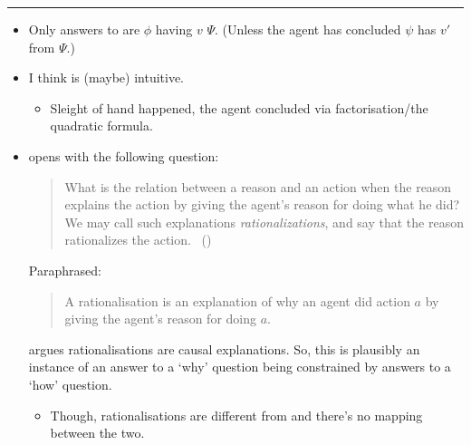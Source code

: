 \documentclass[10pt]{article}
\newcommand\lLine{{\color{lightgray} \noindent\rule{\textwidth}{0.4pt}}}
\begin{document}
\begin{comment}
  This is where some important work is done.
  The thing is, this is set up in a careful way.
  \fofr{3} answer both \qWhy{} and \qHow{}.
  So, it's possible for a \fofr{} between a \prop{0}-\val{0} pair and \pool{} distinct from the \prop{0}-\val{0}-\pool{0} pair directly related to the conclusion to answer both \qWhy{} and \qHow{}.

  Key observation is that if the agent has not concluded \(\pv{\psi}{v'}\) from \(\Psi\) then \(\pv{\psi}{v'}\) \fof{} \(\Psi\) does not answer \qHow{}.
\end{comment}

\lLine

\begin{note}
  \begin{itemize}[noitemsep]
  \item
    Only answers to \qWhy{} are \(\phi\) having \val{} \(v\) \fingf{} \(\Psi\). \hfill (Unless the agent has concluded \(\psi\) has \val{} \(v'\) from \(\Psi\).)
  \item
    I think \issueInclusion{} is (maybe) intuitive.
    \begin{itemize}
    \item
      Sleight of hand happened, the agent concluded via factorisation/the quadratic formula.
    \end{itemize}
  \item
    \citeauthor{Davidson:1963aa} opens  with the following question:

    \begin{quote}
      What is the relation between a reason and an action when the reason explains the action by giving the agent's reason for doing what he did?
      We may call such explanations \emph{rationalizations}, and say that the reason rationalizes the action.%
      \mbox{ }\hfill\mbox{(\citeyear[685]{Davidson:1963aa})}
    \end{quote}

    Paraphrased:
    \begin{quote}
      A rationalisation is an explanation of why an agent did action \(a\) by giving the agent's reason for doing \(a\).
    \end{quote}
    \citeauthor{Davidson:1963aa} argues rationalisations are causal explanations.
    So, this is plausibly an instance of an answer to a `why' question being constrained by answers to a `how' question.
    \begin{itemize}
    \item
      Though, rationalisations are different from  and there's no mapping between the two.
    \end{itemize}
  \end{itemize}
\end{note}
\end{document}
